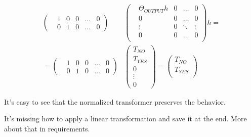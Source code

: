 \begin{align*}
    \left(\begin{matrix}
        &1 &0 &0 &\dots &0 \\
        &0 &1 &0 &\dots &0 
    \end{matrix}\right)
    &\left(\begin{matrix}
        &\Theta_{OUTPUT}h &0 &\dots  &0 \\
        &0                &0 &\dots  &0 \\
        &\vdots           &0 &\ddots &\vdots \\
        &0                &0 &\dots  &0 \\
    \end{matrix}\right)h = \\
    = \left(\begin{matrix}
        &1 &0 &0 &\dots &0 \\
        &0 &1 &0 &\dots &0 
    \end{matrix}\right)
    &\left(\begin{matrix}
        T_{NO} \\
        T_{YES} \\ 
        0 \\
        \vdots \\
        0
    \end{matrix}\right) = 
    \left(\begin{matrix}
        T_{NO} \\
        T_{YES} \\ 
    \end{matrix}\right)
\end{align*}

It's easy to see that the normalized transformer preserves the behavior.

It's missing how to apply a linear transformation and save it at the end. More about that in requirements.


